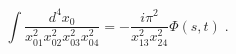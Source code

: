 \begin{equation}\label{box}
  \int \frac{d^4x_0}{x_{01}^2x_{02}^2x_{03}^2x_{04}^2} = - \frac{i\pi^2}{x^2_{13}x^2_{24}} \Phi(s,t)\;. 
\end{equation} 
